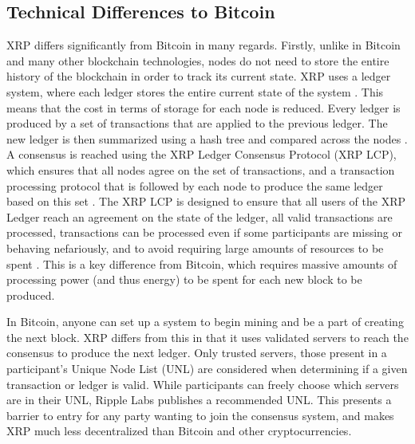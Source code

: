 \documentclass[11pt,a4paper]{article}
\begin{document}
	\subsection{Technical Differences to Bitcoin}
	
	XRP differs significantly from Bitcoin in many regards. Firstly, unlike in Bitcoin and many other blockchain technologies, nodes do not need to store the entire history of the blockchain in order to track its current state. XRP uses a ledger system, where each ledger stores the entire current state of the system \cite{rippledevelopers}. This means that the cost in terms of storage for each node is reduced. Every ledger is produced by a set of transactions that are applied to the previous ledger. The new ledger is then summarized using a hash tree and compared across the nodes \cite{bitcoinmagazine}. A consensus is reached using the XRP Ledger Consensus Protocol (XRP LCP), which ensures that all nodes agree on the set of transactions, and a transaction processing protocol that is followed by each node to produce the same ledger based on this set \cite{Chase}. The XRP LCP is designed to ensure that all users of the XRP Ledger reach an agreement on the state of the ledger, all valid transactions are processed, transactions can be processed even if some participants are missing or behaving nefariously, and to avoid requiring large amounts of resources to be spent \cite{rippledevelopers}. This is a key difference from Bitcoin, which requires massive amounts of processing power (and thus energy) to be spent for each new block to be produced.
	
	In Bitcoin, anyone can set up a system to begin mining and be a part of creating the next block. XRP differs from this in that it uses validated servers to reach the consensus to produce the next ledger. Only trusted servers, those present in a participant's Unique Node List (UNL) are considered when determining if a given transaction or ledger is valid. While participants can freely choose which servers are in their UNL, Ripple Labs publishes a recommended UNL. This presents a barrier to entry for any party wanting to join the consensus system, and makes XRP much less decentralized than Bitcoin and other cryptocurrencies.
	
\end{document}
